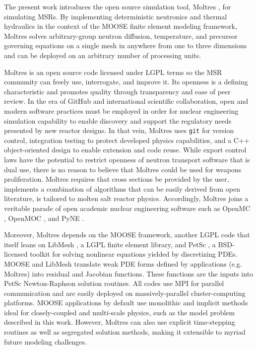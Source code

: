 \documentclass{article}
\begin{document}
The present work introduces the open source simulation tool, Moltres
\cite{lindsay_moltres_2017}, for simulating \glspl{MSR}.  By implementing
deterministic neutronics and thermal hydraulics in the context of the
\gls{MOOSE} finite element modeling framework, Moltres solves arbitrary-group
neutron diffusion, temperature, and precursor governing equations on a single
mesh in anywhere from one to three dimensions and can be deployed on an
arbitrary number of processing units.

Moltres is an open source code licensed under \gls{LGPL} terms so the
\gls{MSR} community can freely use, interrogate, and improve it.  Its openness
is a defining characteristic and promotes
quality through transparency and ease of peer review. In the era of
GitHub \cite{github_build_2017} and international scientific collaboration,
open and modern software practices must be employed in order for nuclear
engineering simulation capability to enable discovery and support the regulatory
needs presented by new reactor designs. In that vein, Moltres uses
\texttt{git} for version control, integration testing to protect
developed physics capabilities, and a C++ object-oriented design to
enable extension and code reuse. While export control laws have the potential
to restrict openness of neutron transport software that is dual use, there is
no reason to believe that Moltres could be used for weapons proliferation.
Moltres requires that cross sections be provided by the user, implements a
combination of algorithms that can be easily derived from open literature, is
tailored to molten salt reactor physics. Accordingly, Moltres joins a veritable
parade of open academic nuclear engineering software such as
OpenMC \cite{romano_openmc:_2015}, OpenMOC \cite{boyd_openmoc_2014}, and
PyNE \cite{bates_pyne_2014,biondo_quality_2014}.

Moreover, Moltres depends on the \gls{MOOSE}
framework, \cite{gaston_physics-based_2015} another \gls{LGPL} code that itself
leans on LibMesh \cite{kirk_libmesh:_2006}, a
\gls{LGPL} finite element library, and PetSc \cite{satish_balay_petsc_2015}, a
\gls{BSD}-licensed toolkit for solving nonlinear equations yielded by
discretizing PDEs. \gls{MOOSE} and LibMesh translate weak PDE forms defined by
applications (e.g. Moltres) into residual and Jacobian
functions. These functions are the inputs into PetSc Newton-Raphson solution routines. All
codes use MPI for parallel communication and are easily deployed on
massively-parallel cluster-computing platforms. \gls{MOOSE} applications by
default use monolithic and implicit methods ideal for closely-coupled
and multi-scale physics, such as the model problem described
in this work. However, Moltres can also use explicit
time-stepping routines as well as segregated solution methods, making it
extensible to myriad future modeling challenges.
\end{document}
